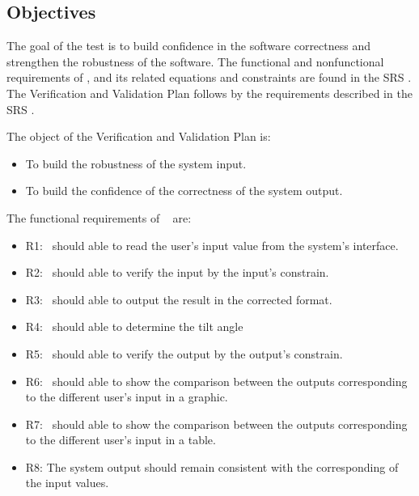 \documentclass[12pt, titlepage]{article}
\begin{document}
\subsection{Objectives}\label{Objectives}

The goal of the test is to build confidence in the software correctness and
strengthen the robustness of the software. The functional and nonfunctional
requirements of \progname, and its related equations and constraints are 
found in the SRS \cite{YS2019}. The Verification and Validation Plan follows
by the requirements described in the SRS \cite{YS2019}.

The object of the Verification and Validation Plan is:
\noindent \begin{itemize}

\item[ ] To build the robustness of the system input.
\item[ ] To build the confidence of the correctness of the system output.

\noindent \end{itemize}


The functional requirements of  \progname~ are:
\noindent \begin{itemize}

\item[ ]R1: \progname~should able to read the user's input value from the
system's interface.

\item[ ]R2: \progname~should able to verify the input by the input's constrain.

\item[ ]R3: \progname~should able to output the result in
the corrected format.

\item[ ]R4: \progname~should able to determine the tilt angle

\item[ ]R5: \progname~should able to verify the output by the output's constrain. 

\item[ ]R6: \progname~should able to show the comparison
between the outputs corresponding to the different user's input in a graphic.

\item[ ]R7: \progname~should able to show the comparison
between the outputs corresponding to the different user's input in a table.

\item[ ]R8: The system output should remain consistent with
the corresponding of the input values.

\end{itemize}
\end{document}
